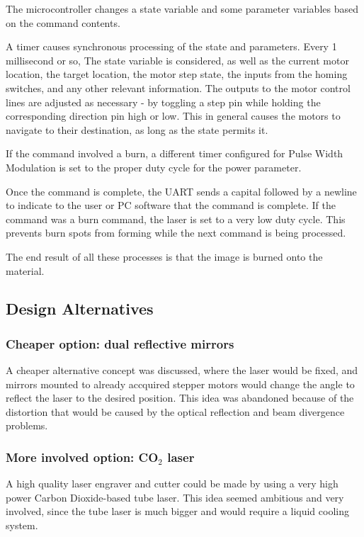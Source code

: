 \documentclass[11pt]{LaTeX-Classes/math-hw}
\begin{document}
The microcontroller changes a state variable and some parameter variables based on the command contents.

A timer causes synchronous processing of the state and parameters. Every 1 millisecond or so,
The state variable is considered, as well as the current motor location, the target location,
the motor step state, the inputs from the homing switches, and any other relevant information.
The outputs to the motor control lines are adjusted as necessary - by toggling a step pin while
holding the corresponding direction pin high or low.
This in general causes the motors to navigate
to their destination, as long as the state permits it.

If the command involved a burn, a different timer configured for Pulse Width Modulation is set
to the proper duty cycle for the power parameter.

Once the command is complete, the UART sends a capital  followed by a newline
to indicate to the user or PC software that the command is complete.
If the command was a burn command, the laser is set to a very low duty cycle. This prevents
burn spots from forming while the next command is being processed.

The end result of all these processes is that the image is burned onto the material.

\subsection{Design Alternatives}
\subsubsection{Cheaper option: dual reflective mirrors}
A cheaper alternative concept was discussed, where the laser would be fixed, and
mirrors mounted to already accquired stepper motors would change the angle to reflect
the laser to the desired position. This idea was abandoned because of the distortion
that would be caused by the optical reflection and beam divergence problems.

\subsubsection{More involved option: CO$_2$ laser}
A high quality laser engraver and cutter could be made by using a very high power Carbon Dioxide-based
tube laser. This idea seemed ambitious and very involved, since the tube laser is much bigger
and would require a liquid cooling system.
\end{document}
